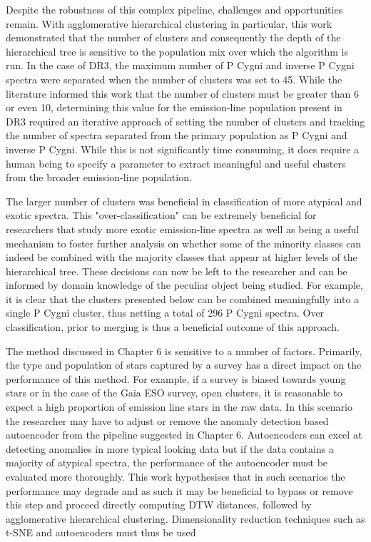 Despite the robustness of this complex pipeline, challenges and opportunities remain. With agglomerative hierarchical clustering in particular, this work demonstrated that the number of clusters and consequently the depth of the hierarchical tree is sensitive to the population mix over which the algorithm is run. In the case of DR3, the maximum number of P Cygni and inverse P Cygni spectra were separated when the number of clusters was set to 45. While the literature informed this work that the number of clusters must be greater than 6 or even 10, determining this value for the emission-line population present in DR3 required an iterative approach of setting the number of clusters and tracking the number of spectra separated from the primary population as P Cygni and inverse P Cygni. While this is not significantly time consuming, it does require a human being to specify a parameter to extract meaningful and useful clusters from the broader emission-line population. 

The larger number of clusters was beneficial in classification of more atypical and exotic spectra. This "over-classification" can be extremely beneficial for researchers that study more exotic emission-line spectra as well as being a useful mechanism to foster further analysis on whether some of the minority classes can indeed be combined with the majority classes that appear at higher levels of the hierarchical tree. These decisions can now be left to the researcher and can be informed by domain knowledge of the peculiar object being studied. For example, it is clear that the clusters presented below can be combined meaningfully into a single P Cygni cluster, thus netting a total of 296 P Cygni spectra. Over classification, prior to merging is thus a beneficial outcome of this approach. 

The method discussed in Chapter 6 is sensitive to a number of factors. Primarily, the type and population of stars captured by a survey has a direct impact on the performance of this method. For example, if a survey is biased towards young stars or in the case of the Gaia ESO survey, open clusters, it is reasonable to expect a high proportion of emission line stars in the raw data. In this scenario the researcher may have to adjust or remove the anomaly detection based autoencoder from the pipeline suggested in Chapter 6. Autoencoders can excel at detecting anomalies in more typical looking data but if the data contains a majority of atypical spectra, the performance of the autoencoder must be evaluated more thoroughly. This work hypothesises that in such scenarios the performance may degrade and as such it may be beneficial to bypass or remove this step and proceed directly computing DTW distances, followed by agglomerative hierarchical clustering. Dimensionality reduction techniques such as t-SNE and autoencoders must thus be used 

